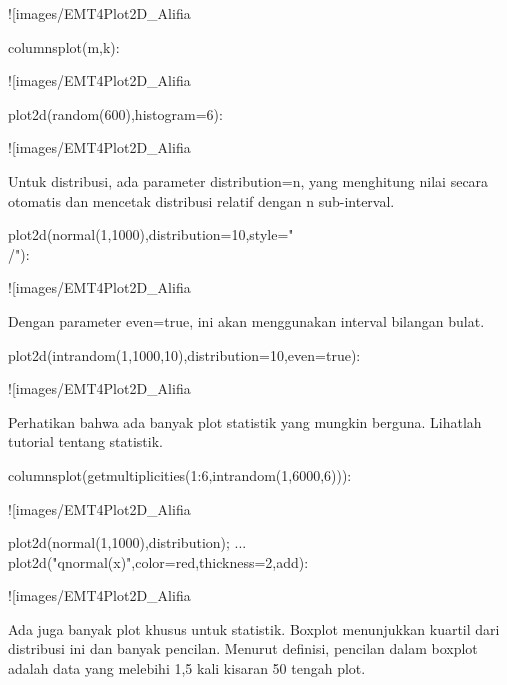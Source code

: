 \documentclass{article}
\begin{document}
![images/EMT4Plot2D_Alifia%

\>columnsplot(m,k):


![images/EMT4Plot2D_Alifia%

\>plot2d(random(600),histogram=6):


![images/EMT4Plot2D_Alifia%

Untuk distribusi, ada parameter distribution=n, yang menghitung nilai
secara otomatis dan mencetak distribusi relatif dengan n sub-interval.


\>plot2d(normal(1,1000),distribution=10,style="\\/"):


![images/EMT4Plot2D_Alifia%

Dengan parameter even=true, ini akan menggunakan interval bilangan
bulat.


\>plot2d(intrandom(1,1000,10),distribution=10,even=true):


![images/EMT4Plot2D_Alifia%

Perhatikan bahwa ada banyak plot statistik yang mungkin berguna.
Lihatlah tutorial tentang statistik.


\>columnsplot(getmultiplicities(1:6,intrandom(1,6000,6))):


![images/EMT4Plot2D_Alifia%

\>plot2d(normal(1,1000),\>distribution); ...  
\>     plot2d("qnormal(x)",color=red,thickness=2,\>add):


![images/EMT4Plot2D_Alifia%

Ada juga banyak plot khusus untuk statistik. Boxplot menunjukkan
kuartil dari distribusi ini dan banyak pencilan. Menurut definisi,
pencilan dalam boxplot adalah data yang melebihi 1,5 kali kisaran 50%
tengah plot.
\end{document}
